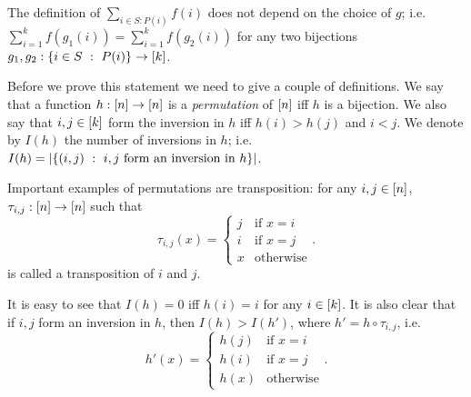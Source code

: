 \begin{theorem}
\label{theorem:sum-correctness}
    The definition of $\sum_{i \in S : P(i)} f(i)$ does not depend on the choice
    of $g$;
    i.e. $\sum_{i = 1}^k f(g_1(i)) = \sum_{i = 1}^k f(g_2(i))$
    for any two bijections $g_1, g_2 : \set[P(i)]{i \in S} \to \range{k}$.
\end{theorem}
Before we prove this statement we need to give a couple of definitions.
We say that a function $h : {[{n}]} \to {[{n}]}$ is a \emph{permutation} of
${[{n}]}$ iff $h$ is a bijection. We also say that
$i, j \in {[{k}]}$ form the inversion in $h$ iff $h(i) > h(j)$ and $i < j$.
We denote by $I(h)$ the number of inversions in $h$; i.e. $I(h) =
\cardinality{\set[i, j \text{ form an inversion in } h]{(i, j)}}$.

Important examples of permutations are transposition: for any
$i, j \in {[{n}]}$, $\tau_{i, j} : {[{n}]} \to {[{n}]}$ such that
\[
    \tau_{i, j}(x) =
    \begin{cases}
        j & \text{if } x = i \\
        i & \text{if } x = j \\
        x & \text{otherwise}
    \end{cases}.
\]
is called a transposition of $i$ and $j$.

It is easy to see that $I(h) = 0$ iff $h(i) = i$ for any $i \in {[{k}]}$.
It is also clear that if $i, j$ form an inversion in $h$, then $I(h) > I(h')$,
where $h' = h \circ \tau_{i, j}$, i.e.
\[
    h'(x) =
    \begin{cases}
        h(j) & \text{if } x = i \\
        h(i) & \text{if } x = j \\
        h(x) & \text{otherwise}
    \end{cases}.
\]


